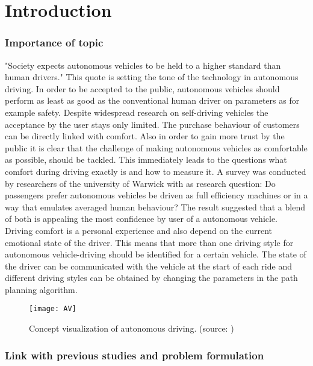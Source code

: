 \chapter{Introduction}
\label{cha:intro}
\subsection{Importance of topic}
"Society expects autonomous vehicles to be held to a higher standard than human drivers." \cite{Prof.Amnon} This quote is setting the tone of the technology in autonomous driving. In order to be accepted to the public, autonomous vehicles should perform as least as good as the conventional human driver on parameters as for example safety. Despite widespread research on self-driving vehicles the acceptance by the user stays only limited.\cite{Bae2019} The purchase behaviour of customers can be directly linked with comfort. Also in order to gain more trust by the public it is clear that the challenge of making autonomous vehicles as comfortable as possible, should be tackled. This immediately leads to the questions what comfort during driving exactly is and how to measure it. A survey was conducted by researchers of the university of Warwick with as research question: Do passengers prefer autonomous vehicles be driven as full efficiency machines or in a way that emulates averaged human behaviour? \cite{UniversityofWarwick2019} The result suggested that a blend of both is appealing the most confidence by user of a autonomous vehicle.\\
Driving comfort is a personal experience and also depend on the current emotional state of the driver. This means that more than one driving style for autonomous vehicle-driving should be identified for a certain vehicle. \cite{Eindhoven2019} The state of the driver can be communicated with the vehicle at the start of each ride and different driving styles can be obtained by changing the parameters in the path planning algorithm. 

\begin{figure}[h!]
	\centering
	\texttt{[image: AV]}
	\caption{Concept visualization of autonomous driving. (source: \cite{AV})}
	\label{fig:AV}
\end{figure} 
\subsection{Link with previous studies and problem formulation}

